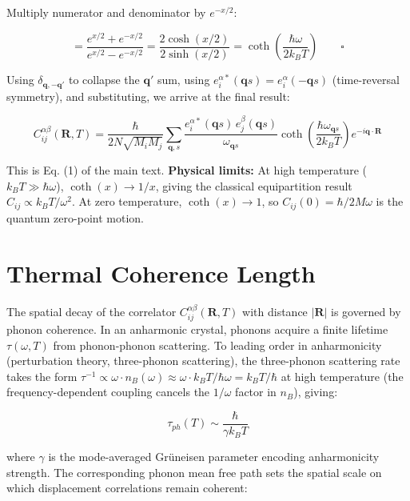 \documentclass[aps,prb,reprint,amsmath,amssymb,floatfix]{revtex4-2}
\begin{document}
Multiply numerator and denominator by \(e^{-x/2}\):

\begin{equation*}
= \frac{e^{x/2}+e^{-x/2}}{e^{x/2}-e^{-x/2}} = \frac{2\cosh(x/2)}{2\sinh(x/2)} = \coth\!\left(\frac{\hbar\omega}{2k_BT}\right) \qquad \square
\end{equation*}

Using \(\delta_{\mathbf{q},-\mathbf{q}'}\) to collapse the
\(\mathbf{q}'\) sum, using
\(e_i^{\alpha*}(\mathbf{q}s) = e_i^\alpha(-\mathbf{q}s)\) (time-reversal
symmetry), and substituting, we arrive at the final result:

{\footnotesize
\begin{equation*}
\boxed{C_{ij}^{\alpha\beta}(\mathbf{R},T) = \frac{\hbar}{2N\sqrt{M_iM_j}}\sum_{\mathbf{q},s}\frac{e_i^{\alpha*}(\mathbf{q}s)\,e_j^{\beta}(\mathbf{q}s)}{\omega_{\mathbf{q}s}}\coth\!\left(\frac{\hbar\omega_{\mathbf{q}s}}{2k_BT}\right)e^{-i\mathbf{q}\cdot\mathbf{R}}}
\end{equation*}
}

This is Eq. (1) of the main text. \textbf{Physical limits:} At high
temperature (\(k_BT\gg\hbar\omega\)), \(\coth(x)\to 1/x\), giving the
classical equipartition result \(C_{ij}\propto k_BT/\omega^2\). At zero
temperature, \(\coth(x)\to 1\), so \(C_{ij}(0) = \hbar/2M\omega\) is the
quantum zero-point motion.


\section{Thermal Coherence
Length}\label{appendix-b-thermal-coherence-length}

The spatial decay of the correlator
\(C_{ij}^{\alpha\beta}(\mathbf{R},T)\) with distance \(|\mathbf{R}|\) is
governed by phonon coherence. In an anharmonic crystal, phonons acquire
a finite lifetime \(\tau(\omega,T)\) from phonon-phonon scattering. To
leading order in anharmonicity (perturbation theory, three-phonon
scattering), the three-phonon scattering rate takes the form
\(\tau^{-1} \propto \omega\cdot n_B(\omega) \approx \omega\cdot k_BT/\hbar\omega = k_BT/\hbar\) at high
temperature (the frequency-dependent coupling cancels the \(1/\omega\)
factor in \(n_B\)), giving:

\begin{equation*}
\tau_{ph}(T) \sim \frac{\hbar}{\gamma k_BT}
\end{equation*}

where \(\gamma\) is the mode-averaged Grüneisen parameter encoding
anharmonicity strength. The corresponding phonon mean free path sets the
spatial scale on which displacement correlations remain coherent:
\end{document}
